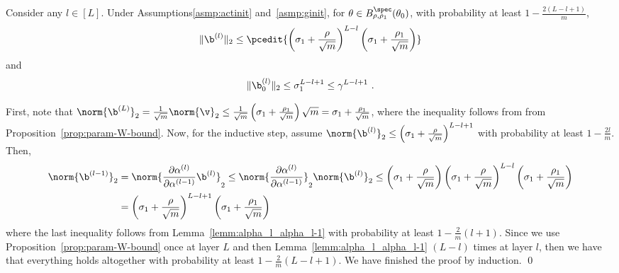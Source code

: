 \begin{lemm}
Consider any $l\in[L]$. Under Assumptions\ref{asmp:actinit} and~\ref{asmp:ginit}, for $\theta \in B_{\rho,\rho_1}^{\spec}(\theta_0)$, 
with probability at least $1-\frac{2(L-l+1)}{m}$,
\begin{equation}
 \| \b^{(l)} \|_2 \leq\pcedit{ \left( \sigma_1 +\frac{\rho}{\sqrt{m}} \right)^{L-l} \left(\sigma_1+\frac{\rho_1}{\sqrt{m}}\right)}%
\end{equation}
and
\begin{equation}
    \| \b_0^{(l)} \|_2 \leq \sigma_1^{L-l+1} \leq \gamma^{L-l+1}~.
\end{equation}
\label{lem:b_l2}
\end{lemm}
\proof 
%
First, note that $\norm{\b^{(L)}}_2=\frac{1}{\sqrt{m}}\norm{\v}_2\leq \frac{1}{\sqrt{m}}\left(\sigma_1+\frac{\rho_1}{\sqrt{m}}\right)\sqrt{m}=\sigma_1+\frac{\rho_1}{\sqrt{m}}$, where the inequality follows from from Proposition~\ref{prop:param-W-bound}. Now, for the inductive step, assume $\norm{\b^{(l)}}_2\leq\left(\sigma_1+\frac{\rho}{\sqrt{m}}\right)^{L-l+1}$ with probability at least $1-\frac{2l}{m}$. Then,
\begin{align*}
\norm{\b^{(l-1)}}_2 & = \norm{\frac{\partial \alpha^{(l)}}{\partial \alpha^{(l-1)}}\b^{(l)}}_2\leq \norm{\frac{\partial \alpha^{(l)}}{\partial \alpha^{(l-1)}}}_2\norm{\b^{(l)}}_2\leq \left(\sigma_1+\frac{\rho}{\sqrt{m}}\right)\left(\sigma_1+\frac{\rho}{\sqrt{m}}\right)^{L-l}\left(\sigma_1+\frac{\rho_1}{\sqrt{m}}\right)\\
& =\left(\sigma_1+\frac{\rho}{\sqrt{m}}\right)^{L-l+1}\left(\sigma_1+\frac{\rho_1}{\sqrt{m}}\right)
\end{align*}
where the last inequality follows from Lemma~\ref{lemm:alpha_l_alpha_l-1} with probability at least $1-\frac{2}{m}(l+1)$. Since we use Proposition~\ref{prop:param-W-bound} once at layer $L$ and then Lemma~\ref{lemm:alpha_l_alpha_l-1} $(L-l)$ times at layer $l$, then we have that everything holds altogether with probability at least $1-\frac{2}{m}(L-l+1)$. We have finished the proof by induction.
\qed 
%
%
%






